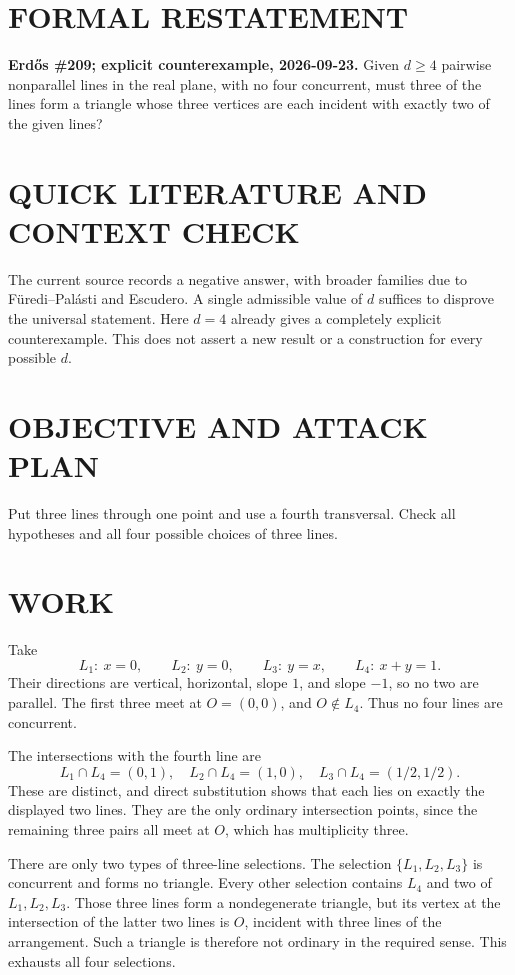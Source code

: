 \section{FORMAL RESTATEMENT}
\textbf{Erd\H{o}s \#209; explicit counterexample, 2026-09-23.}
Given $d\geq4$ pairwise nonparallel lines in the real plane, with no four concurrent, must three of the lines form a triangle whose three vertices are each incident with exactly two of the given lines?

\section{QUICK LITERATURE AND CONTEXT CHECK}
The current source records a negative answer, with broader families due to F\"uredi--Pal\'asti and Escudero. A single admissible value of $d$ suffices to disprove the universal statement. Here $d=4$ already gives a completely explicit counterexample. This does not assert a new result or a construction for every possible $d$.

\section{OBJECTIVE AND ATTACK PLAN}
Put three lines through one point and use a fourth transversal. Check all hypotheses and all four possible choices of three lines.

\section{WORK}
Take
\[
L_1:\ x=0,\qquad L_2:\ y=0,\qquad
L_3:\ y=x,\qquad L_4:\ x+y=1.
\tag{1}
\]
Their directions are vertical, horizontal, slope $1$, and slope $-1$, so no two are parallel. The first three meet at $O=(0,0)$, and $O\notin L_4$. Thus no four lines are concurrent.

The intersections with the fourth line are
\[
L_1\cap L_4=(0,1),\quad L_2\cap L_4=(1,0),\quad
L_3\cap L_4=(1/2,1/2).
\tag{2}
\]
These are distinct, and direct substitution shows that each lies on exactly the displayed two lines. They are the only ordinary intersection points, since the remaining three pairs all meet at $O$, which has multiplicity three.

There are only two types of three-line selections. The selection $\{L_1,L_2,L_3\}$ is concurrent and forms no triangle. Every other selection contains $L_4$ and two of $L_1,L_2,L_3$. Those three lines form a nondegenerate triangle, but its vertex at the intersection of the latter two lines is $O$, incident with three lines of the arrangement. Such a triangle is therefore not ordinary in the required sense. This exhausts all four selections.

